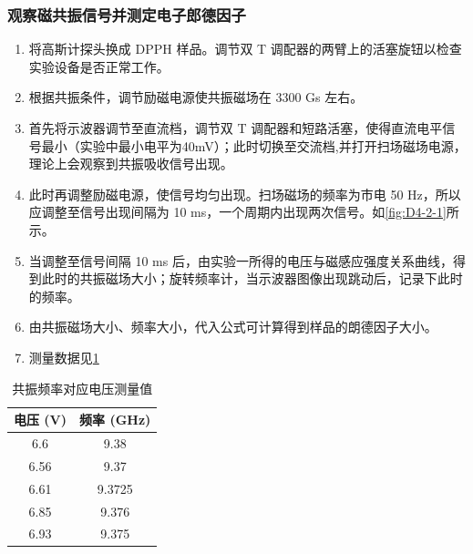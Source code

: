 \documentclass[dvipsnames, svgnames,a4paper,11pt]{article}
\begin{document}

	\subsubsection{观察磁共振信号并测定电子郎德因子}

		\begin{enumerate}
			\item 将高斯计探头换成 DPPH 样品。调节双 T 调配器的两臂上的活塞旋钮以检查实验设备是否正常工作。
			\item 根据共振条件，调节励磁电源使共振磁场在 3300 Gs 左右。
			\item 首先将示波器调节至直流档，调节双 T 调配器和短路活塞，使得直流电平信号最小（实验中最小电平为40mV）；此时切换至交流档,并打开扫场磁场电源，理论上会观察到共振吸收信号出现。
			\item 此时再调整励磁电源，使信号均匀出现。扫场磁场的频率为市电 50 Hz，所以应调整至信号出现间隔为 10 ms，一个周期内出现两次信号。如\cref{fig:D4-2-1}所示。
			\item 当调整至信号间隔 10 ms 后，由实验一所得的电压与磁感应强度关系曲线，得到此时的共振磁场大小；旋转频率计，当示波器图像出现跳动后，记录下此时的频率。
			\item 由共振磁场大小、频率大小，代入公式可计算得到样品的朗德因子大小。
			\item 测量数据见\cref{tbl:D4-1-2}
		\end{enumerate}

		\begin{table}[ht]
			\centering
			\begin{tabular}{|c|c|}
			\hline
			\textbf{电压 (V)} & \textbf{频率 (GHz)} \\
			\hline
			6.6  & 9.38 \\
			6.56 & 9.37 \\
			6.61 & 9.3725 \\
			6.85 & 9.376 \\
			6.93 & 9.375 \\
			\hline
			\end{tabular}
			\caption{共振频率对应电压测量值}
			\label{tbl:D4-1-2}
		\end{table}
			
\end{document}
